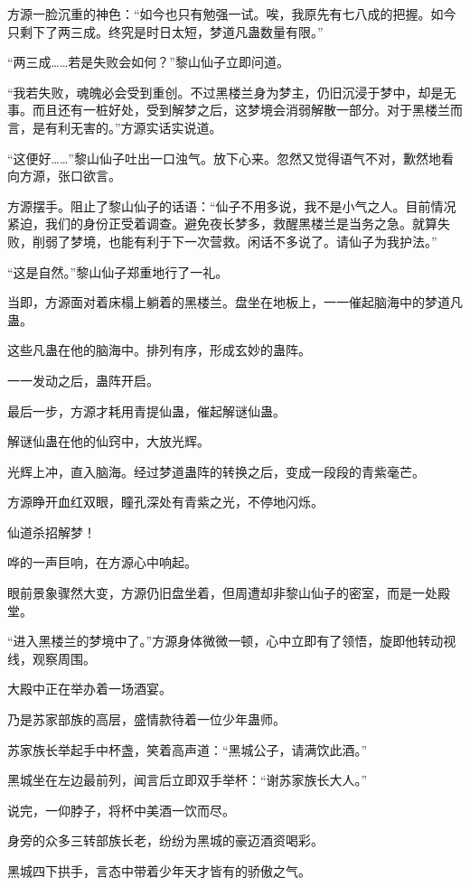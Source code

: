 \begin{this_body}
方源一脸沉重的神色：“如今也只有勉强一试。唉，我原先有七八成的把握。如今只剩下了两三成。终究是时日太短，梦道凡蛊数量有限。”

“两三成……若是失败会如何？”黎山仙子立即问道。

“我若失败，魂魄必会受到重创。不过黑楼兰身为梦主，仍旧沉浸于梦中，却是无事。而且还有一桩好处，受到解梦之后，这梦境会消弱解散一部分。对于黑楼兰而言，是有利无害的。”方源实话实说道。

“这便好……”黎山仙子吐出一口浊气。放下心来。忽然又觉得语气不对，歉然地看向方源，张口欲言。

方源摆手。阻止了黎山仙子的话语：“仙子不用多说，我不是小气之人。目前情况紧迫，我们的身份正受着调查。避免夜长梦多，救醒黑楼兰是当务之急。就算失败，削弱了梦境，也能有利于下一次营救。闲话不多说了。请仙子为我护法。”

“这是自然。”黎山仙子郑重地行了一礼。

当即，方源面对着床榻上躺着的黑楼兰。盘坐在地板上，一一催起脑海中的梦道凡蛊。

这些凡蛊在他的脑海中。排列有序，形成玄妙的蛊阵。

一一发动之后，蛊阵开启。

最后一步，方源才耗用青提仙蛊，催起解谜仙蛊。

解谜仙蛊在他的仙窍中，大放光辉。

光辉上冲，直入脑海。经过梦道蛊阵的转换之后，变成一段段的青紫毫芒。

方源睁开血红双眼，瞳孔深处有青紫之光，不停地闪烁。

仙道杀招解梦！

哗的一声巨响，在方源心中响起。

眼前景象骤然大变，方源仍旧盘坐着，但周遭却非黎山仙子的密室，而是一处殿堂。

“进入黑楼兰的梦境中了。”方源身体微微一顿，心中立即有了领悟，旋即他转动视线，观察周围。

大殿中正在举办着一场酒宴。

乃是苏家部族的高层，盛情款待着一位少年蛊师。

苏家族长举起手中杯盏，笑着高声道：“黑城公子，请满饮此酒。”

黑城坐在左边最前列，闻言后立即双手举杯：“谢苏家族长大人。”

说完，一仰脖子，将杯中美酒一饮而尽。

身旁的众多三转部族长老，纷纷为黑城的豪迈酒资喝彩。

黑城四下拱手，言态中带着少年天才皆有的骄傲之气。


\end{this_body}
